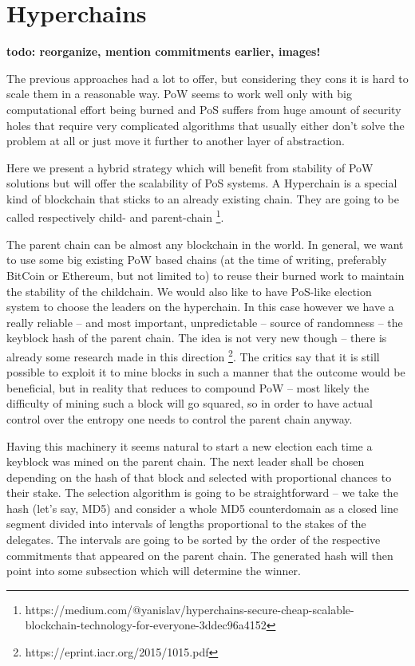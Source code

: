 \section{Hyperchains}

\textbf{todo: reorganize, mention commitments earlier, images!}

The previous approaches had a lot to offer, but considering they cons it is hard
to scale them in a reasonable way. PoW seems to work well only with big
computational effort being burned and PoS suffers from huge amount of security
holes that require very complicated algorithms that usually either don't solve
the problem at all or just move it further to another layer of abstraction.

Here we present a hybrid strategy which will benefit from stability of PoW
solutions but will offer the scalability of PoS systems. A Hyperchain is a
special kind of blockchain that sticks to an already existing chain. They are
going to be called respectively child- and parent-chain
\footnote{https://medium.com/@yanislav/hyperchains-secure-cheap-scalable-blockchain-technology-for-everyone-3ddec96a4152}.

The parent chain can be almost any blockchain in the world. In general, we want
to use some big existing PoW based chains (at the time of writing, preferably
BitCoin or Ethereum, but not limited to) to reuse their burned work to maintain
the stability of the childchain. We would also like to have
PoS-like election system to choose the leaders on the hyperchain. In this case
however we have a really reliable – and most important, unpredictable – source
of randomness – the keyblock hash of the parent chain. The idea is not very new
though – there is already some research made in this direction
\footnote{https://eprint.iacr.org/2015/1015.pdf}.
The critics say that it is still possible to exploit it to mine blocks in such a
manner that the outcome would be beneficial, but in reality that reduces to
compound PoW – most likely the difficulty of mining such a block will go
squared, so in order to have actual control over the entropy one needs to
control the parent chain anyway.

Having this machinery it seems natural to start a new election each time a
keyblock was mined on the parent chain. The next leader shall be chosen
depending on the hash of that block and selected with proportional chances to
their stake. The selection algorithm is going to be straightforward – we take
the hash (let's say, MD5) and consider a whole MD5 counterdomain as a closed
line segment divided into intervals of lengths proportional to the stakes of the
delegates. The intervals are going to be sorted by the order of the respective
commitments that appeared on the parent chain. The generated hash will then
point into some subsection which will determine the winner.

